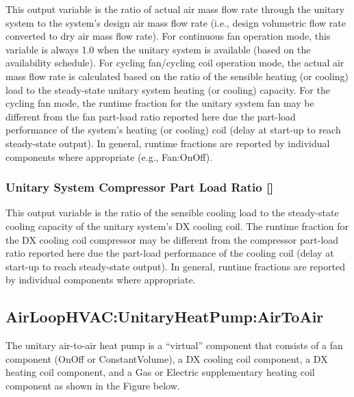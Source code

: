 This output variable is the ratio of actual air mass flow rate through the unitary system to the system's design air mass flow rate (i.e., design volumetric flow rate converted to dry air mass flow rate). For continuous fan operation mode, this variable is always 1.0 when the unitary system is available (based on the availability schedule). For cycling fan/cycling coil operation mode, the actual air mass flow rate is calculated based on the ratio of the sensible heating (or cooling) load to the steady-state unitary system heating (or cooling) capacity. For the cycling fan mode, the runtime fraction for the unitary system fan may be different from the fan part-load ratio reported here due the part-load performance of the system's heating (or cooling) coil (delay at start-up to reach steady-state output). In general, runtime fractions are reported by individual components where appropriate (e.g., Fan:OnOff).

\subsubsection{Unitary System Compressor Part Load Ratio {[]}}\label{unitary-system-compressor-part-load-ratio-1}

This output variable is the ratio of the sensible cooling load to the steady-state cooling capacity of the unitary system's DX cooling coil. The runtime fraction for the DX cooling coil compressor may be different from the compressor part-load ratio reported here due the part-load performance of the cooling coil (delay at start-up to reach steady-state output). In general, runtime fractions are reported by individual components where appropriate.

\subsection{AirLoopHVAC:UnitaryHeatPump:AirToAir}\label{airloophvacunitaryheatpumpairtoair}

The unitary air-to-air heat pump is a ``virtual'' component that consists of a fan component (OnOff or ConstantVolume), a DX cooling coil component, a DX heating coil component, and a Gas or Electric supplementary heating coil component as shown in the Figure below.


